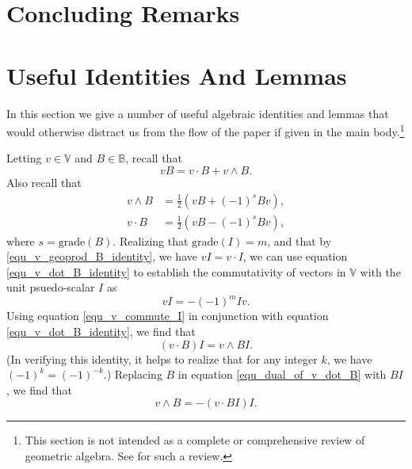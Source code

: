 \documentclass{birkjour}
\theoremstyle{definition}
\theoremstyle{remark}
\numberwithin{equation}{section}
\newcommand{\B}{\mathbb{B}}
\newcommand{\V}{\mathbb{V}}
\newcommand{\grade}{\mbox{grade}}
\begin{document}

\section{Concluding Remarks}


\section{Useful Identities And Lemmas}\label{sec_useful_identities}

In this section we give a number of useful algebraic identities and lemmas that would
otherwise distract us from the flow of the paper if given in the main body.\footnote{This
section is not intended as a complete or comprehensive review of geometric algebra.
See \cite{} for such a review.}

Letting $v\in\V$ and $B\in\B$, recall that
\begin{equation}\label{equ_v_geoprod_B_identity}
vB = v\cdot B+v\wedge B.
\end{equation}
Also recall that
\begin{align}
v\wedge B &= \frac{1}{2}(vB+(-1)^sBv),\label{equ_v_wedge_B_identity} \\
v\cdot B &= \frac{1}{2}(vB-(-1)^sBv),\label{equ_v_dot_B_identity}
\end{align}
where $s=\grade(B)$.
Realizing that $\grade(I)=m$, and that by \eqref{equ_v_geoprod_B_identity}, we have $vI=v\cdot I$, we can use
equation \eqref{equ_v_dot_B_identity} to establish the commutativity of vectors in $\V$ with the unit psuedo-scalar $I$ as
\begin{equation}\label{equ_v_commute_I}
vI = -(-1)^mIv.
\end{equation}
Using equation \eqref{equ_v_commute_I} in conjunction with equation \eqref{equ_v_dot_B_identity}, we find that
\begin{equation}\label{equ_dual_of_v_dot_B}
(v\cdot B)I = v\wedge BI.
\end{equation}
(In verifying this identity, it helps to realize that for any integer $k$, we have $(-1)^k=(-1)^{-k}$.)
Replacing $B$ in equation \eqref{equ_dual_of_v_dot_B} with $BI$, we find that
\begin{equation}\label{equ_dual_of_v_dot_dual_B}
v\wedge B = -(v\cdot BI)I.
\end{equation}
\end{document}
